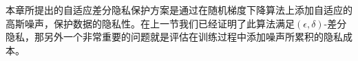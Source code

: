 
本章所提出的自适应差分隐私保护方案是通过在随机梯度下降算法上添加自适应的高斯噪声，保护数据的隐私性。在上一节我们已经证明了此算法满足$(\epsilon, \delta)$-差分隐私，那另外一个非常重要的问题就是评估在训练过程中添加噪声所累积的隐私成本。

